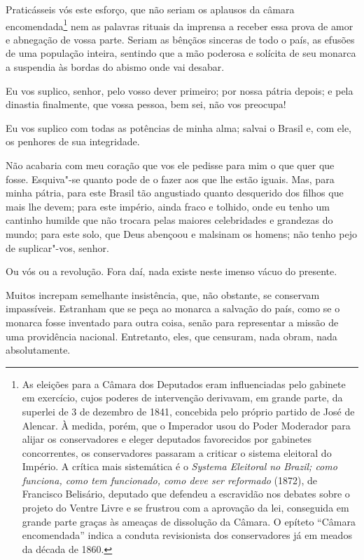  Praticásseis vós este esforço, que não seriam os aplausos da câmara
encomendada\footnote{ As eleições para a Câmara dos Deputados eram influenciadas pelo gabinete
em exercício, cujos poderes de intervenção derivavam, em grande parte,
da superlei de 3 de dezembro de 1841, concebida pelo próprio partido de
José de Alencar. À medida, porém, que o Imperador usou do Poder
Moderador para alijar os conservadores e eleger deputados favorecidos
por gabinetes concorrentes, os conservadores passaram a criticar o
sistema eleitoral do Império. A crítica mais sistemática é o
\textit{Systema Eleitoral no Brazil; como funciona, como tem
funcionado, como deve ser reformado} (1872), de Francisco Belisário,
deputado que defendeu a escravidão nos debates sobre o projeto do
Ventre Livre e se frustrou com a aprovação da lei, conseguida em grande
parte graças às ameaças de dissolução da Câmara. O epíteto ``Câmara
encomendada'' indica a conduta revisionista dos conservadores já em
meados da década de 1860.} nem as palavras rituais da imprensa a receber essa prova de amor e
abnegação de vossa parte. Seriam as bênçãos sinceras de todo o país, as
efusões de uma população inteira, sentindo que a mão poderosa e
solícita de seu monarca a suspendia às bordas do abismo onde vai desabar. 

 Eu vos suplico, senhor, pelo vosso dever primeiro; por nossa pátria
depois; e pela dinastia finalmente, que vossa pessoa, bem sei, não vos preocupa!

 Eu vos suplico com todas as potências de minha alma; salvai o Brasil e,
com ele, os penhores de sua integridade.  

 Não acabaria com meu coração que vos ele pedisse para mim o que quer
que fosse. Esquiva"-se quanto pode de o fazer aos que lhe estão
iguais. Mas, para minha pátria, para este Brasil tão angustiado quanto
desquerido dos filhos que mais lhe devem; para este império, ainda
fraco e tolhido, onde eu tenho um cantinho humilde que não trocara
pelas maiores celebridades e grandezas do mundo; para este solo, que
Deus abençoou e malsinam os homens; não tenho pejo de suplicar"-vos, senhor. 

 Ou vós ou a revolução. Fora daí, nada existe neste imenso vácuo do presente. 

 Muitos increpam semelhante insistência, que, não obstante, se conservam
impassíveis. Estranham que se peça ao monarca a salvação do país, como
se o monarca fosse inventado para outra coisa, senão para representar a
missão de uma providência nacional. Entretanto, eles, que censuram,
nada obram, nada absolutamente.

